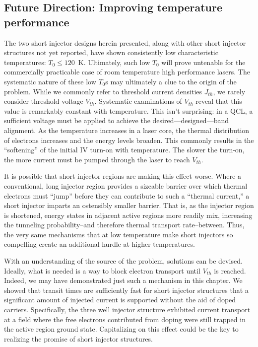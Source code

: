 \subsection{Future Direction: Improving temperature performance}

The two short injector designs herein presented, along with other short injector structures not yet reported, have shown consistently low characteristic temperatures: $T_0\leq120$~K.  Ultimately, such low $T_0$ will prove untenable for the commercially practicable case of room temperature high performance lasers.  The systematic nature of these low $T_0$s may ultimately a clue to the origin of the problem.  While we commonly refer to threshold current densities $J_{th}$, we rarely consider threshold voltage $V_{th}$.  Systematic examinations of $V_{th}$ reveal that this value is remarkably constant with temperature.  This isn't surprising: in a QCL, a sufficient voltage must be applied to achieve the desired---designed---band alignment.  As the temperature increases in a laser core, the thermal distribution of electrons increases and the energy levels broaden.  This commonly results in the ``softening'' of the initial IV turn-on with temperature.  The slower the turn-on, the more current must be pumped through the laser to reach $V_{th}$.

It is possible that short injector regions are making this effect worse.  Where a conventional, long injector region provides a sizeable barrier over which thermal electrons must ``jump'' before they can contribute to such a ``thermal current,'' a short injector imparts an ostensibly smaller barrier.  That is, as the injector region is shortened, energy states in adjacent active regions more readily mix, increasing the tunneling probability--and therefore thermal transport rate--between.  Thus, the very same mechanisms that at low temperature make short injectors so compelling create an additional hurdle at higher temperatures.

With an understanding of the source of the problem, solutions can be devised.  Ideally, what is needed is a way to block electron transport until $V_{th}$ is reached.  Indeed, we may have demonstrated just such a mechanism in this chapter.  We showed that transit times are sufficiently fast for short injector structures that a significant amount of injected current is supported without the aid of doped carriers.  Specifically, the three well injector structure exhibited current transport at a field where the free electrons contributed from doping were still trapped in the active region ground state.  Capitalizing on this effect could be the key to realizing the promise of short injector structures.


%
%
%
% 